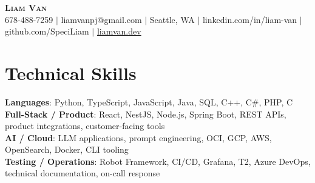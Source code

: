 \documentclass[letterpaper,11pt]{article}
\begin{document}

%
\begin{center}
    \textbf{\Huge \scshape Liam Van} \\ \vspace{1pt}
    \small 678-488-7259 $|$ \small {liamvanpj@gmail.com} $|$ Seattle, WA
 {{$|$ linkedin.com/in/liam-van} {$|$ github.com/SpeciLiam} {$|$ \href{https://liamvan.dev}{liamvan.dev}}}

\end{center}

\section{Technical Skills}
 \begin{itemize}[leftmargin=0.15in, label={}]
    \small{\item{
     \textbf{Languages}{: Python, TypeScript, JavaScript, Java, SQL, C++, C\#, PHP, C} \\
     \textbf{Full-Stack / Product}{: React, NestJS, Node.js, Spring Boot, REST APIs, product integrations, customer-facing tools} \\
     \textbf{AI / Cloud}{: LLM applications, prompt engineering, OCI, GCP, AWS, OpenSearch, Docker, CLI tooling} \\
     \textbf{Testing / Operations}{: Robot Framework, CI/CD, Grafana, T2, Azure DevOps, technical documentation, on-call response} \\
    }}
 \end{itemize}
%

\end{document}
